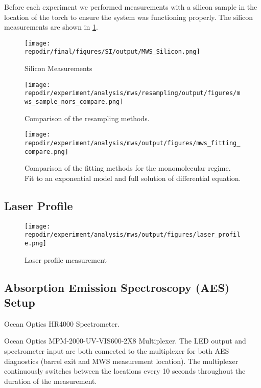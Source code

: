 Before each experiment we performed measurements with a silicon sample in the location of the torch to ensure the system was functioning properly. The silicon measurements are shown in \ref{fig:SI_MWS_Silicon}. 

\begin{figure}[]
\centering
\texttt{[image: \\repodir/final/figures/SI/output/MWS\_Silicon.png]}
\caption{Silicon Measurements}
\label{fig:SI_MWS_Silicon}
\end{figure}




\begin{figure}
\centering
\texttt{[image: \\repodir/experiment/analysis/mws/resampling/output/figures/mws\_sample\_nors\_compare.png]}
\caption{Comparison of the resampling methods.}
\label{fig:SI_mws_resampling}
\end{figure}


\begin{figure}
\centering
\texttt{[image: \\repodir/experiment/analysis/mws/output/figures/mws\_fitting\_compare.png]}
\caption{Comparison of the fitting methods for the monomolecular regime. Fit to an exponential model and full solution of differential equation. }
\label{fig:SI_mws_fitting_compare}
\end{figure}

\clearpage
\subsection{Laser Profile}


\begin{figure}[H]
\centering
\texttt{[image: \\repodir/experiment/analysis/mws/output/figures/laser\_profile.png]}
\caption{Laser profile measurement}
\label{fig:SI_Laser_Profile}
\end{figure}

\clearpage
\subsection{Absorption Emission Spectroscopy (AES) Setup}




Ocean Optics HR4000 Spectrometer. 

Ocean Optics MPM-2000-UV-VIS600-2X8 Multiplexer. The LED output and spectrometer input are both connected to the multiplexer for both AES diagnostics (barrel exit and MWS measurement location). The multiplexer continuously switches between the locations every 10 seconds throughout the duration of the measurement. 


